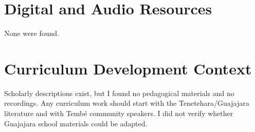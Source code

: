 \documentclass[12pt]{article}
\begin{document}
\section{Digital and Audio Resources}
None were found.

\section{Curriculum Development Context}
Scholarly descriptions exist, but I found no pedagogical materials and no recordings. Any curriculum work should start with the Tenetehara/Guajajara literature and with Temb\'e community speakers. I did not verify whether Guajajara school materials could be adapted.
\end{document}
